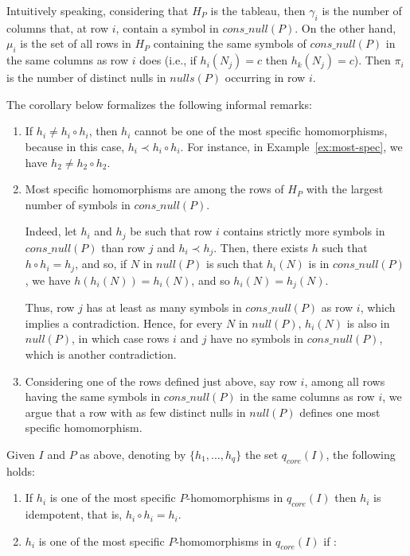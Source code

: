 Intuitively speaking, considering that $H_P$ is the tableau,  then $\gamma_i$ is the number of columns that, at row $i$, contain a symbol in $cons\_null(P)$.
On the other hand, $\mu_i$ is the set of all rows in $H_P$ containing the same symbols of $cons\_null(P)$ in the same columns as row $i$ does (i.e., if $h_i(N_j) = c$ then $h_k(N_j)=c$).
Then $\pi_i$ is the number of distinct nulls in $nulls(P)$ occurring in row $i$.

The corollary below formalizes the following informal remarks:
\begin{enumerate}
    \item If $h_i \ne h_i \circ h_i$, then $h_i$ cannot be one of the most specific homomorphisms, because in this case, $h_i \prec h_i \circ h_i$.
          For instance, in Example~\ref{ex:most-spec}, we have $h_2 \neq h_2 \circ h_2$.

    \item Most specific homomorphisms are among the rows of $H_P$ with the largest number of symbols in $cons\_null(P)$.

          Indeed, let $h_i$ and $h_j$ be such that row $i$ contains strictly more symbols in $cons\_null(P)$ than row $j$ and $h_i \prec h_j$.
          Then, there exists $h$ such that $h \circ h_i = h_j$, and so, if $N$ in $null(P)$ is such that $h_i(N)$ is in $cons\_null(P)$, we have $h(h_i(N))=h_i(N)$, and so $h_i(N)=h_j(N)$.

          Thus, row $j$ has at least as many symbols in $cons\_null(P)$ as row $i$, which implies a contradiction.
          Hence, for every $N$ in $null(P)$, $h_i(N)$ is also in $null(P)$, in which case rows $i$ and $j$ have no symbols in $cons\_null(P)$, which is another contradiction.

    \item Considering one of the rows defined just above, say row $i$, among all rows having the same symbols in $cons\_null(P)$ in the same columns as row $i$, we argue that a row with as few distinct nulls in $null(P)$ defines one most specific homomorphism.
\end{enumerate}

\begin{corollary}
    \label{coro: spec}
    Given $I$ and $P$ as above, denoting by $\{h_1, \ldots, h_q\}$ the set $q_{core}(I)$, the following holds:
    \begin{enumerate}
        \item If $h_i$ is one of the most specific $P$-homomorphisms in $q_{core}(I)$ then $h_i$ is idempotent, that is, $h_i \circ h_i = h_i$.

        \item $h_{i}$ is one of the most specific $P$-homomorphisms in $q_{core}(I)$ if :
    \end{enumerate}
\end{corollary}

